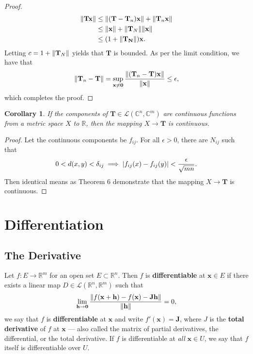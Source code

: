 \documentclass[11pt]{article}
\renewcommand{\vec}[1]{\mathbf{#1}}
\newcommand{\mat}[1]{\mathbf{#1}}
\newtheorem{corollary}{Corollary}
\begin{document}
\begin{adjustwidth}{0.5cm}{}
\begin{proof}
    \begin{align*}
      \norm{\mat{T} \vec{x}} & \le \norm{(\mat{T} - \mat{T}_{n}) \vec{x}} + \norm{\mat{T}_{n} \vec{x}} \\
                             & \le \norm{\vec{x}} + \norm{\mat{T}_{N}} \norm{\vec{x}} \\
                             & \le (1 + \norm{\mat{T_{N}}}) \vec{x}.
    \end{align*}
    Letting $c = 1 + \norm{\mat{T}_{N}}$ yields that $\mat{T}$ is bounded. As per the limit condition, we have that
    \[
      \norm{\mat{T}_{n} - \mat{T}} = \sup\limits_{\vec{x} \ne \vec{0}} \frac{\norm{(\mat{T}_{n} - \mat{T}) \vec{x}}}{\norm{\vec{x}}} \le \epsilon,
    \]
    which completes the proof.
  \end{proof}
\end{adjustwidth}

\begin{corollary}
	If the components of $\mat{T} \in \mathcal{L}(\mathbb{C}^{n}, \mathbb{C}^{m})$ are continuous functions from a metric space $X$ to $\mathbb{R}$, then the mapping $X \to \mat{T}$ is continuous.
\end{corollary}
\begin{adjustwidth}{0.5cm}{}
	\begin{proof}
		Let the continuous components be $f_{ij}$. For all $\epsilon > 0$, there are $N_{ij}$ such that
		\[
			0 < d(x, y) < \delta_{ij} \implies \abs{f_{ij}(x) - f_{ij}(y)} < \frac{\epsilon}{\sqrt{mn}}.
		\]
		Then identical means as Theorem 6 demonstrate that the mapping $X \to \mat{T}$ is continuous.
	\end{proof}
\end{adjustwidth}



\section{Differentiation}


\subsection{The Derivative}

Let $f : E \to \mathbb{R}^{m}$ for an open set $E \subset \mathbb{R}^{n}$. Then $f$ is \textbf{differentiable} at $\vec{x} \in E$ if there exists a linear map $D \in \mathcal{L}(\mathbb{R}^{n}, \mathbb{R}^{m})$ such that
\[
	\lim\limits_{\vec{h} \to \vec{0}} \frac{\norm{f(\vec{x} + \vec{h}) - f(\vec{x}) - \mat{J}\vec{h}}}{\norm{\vec{h}}} = 0,
\] 
we say that $f$ is \textbf{differentiable} at $\vec{x}$ and write $f'(\vec{x}) = \mat{J}$, where $J$ is the \textbf{total derivative} of $f$ at $\vec{x}$ --- also called the matrix of partial derivatives, the differential, or the total derivative. If $f$ is differentiable at \textit{all} $\vec{x} \in U$, we say that $f$ itself is differentiable over $U$.
\end{document}
